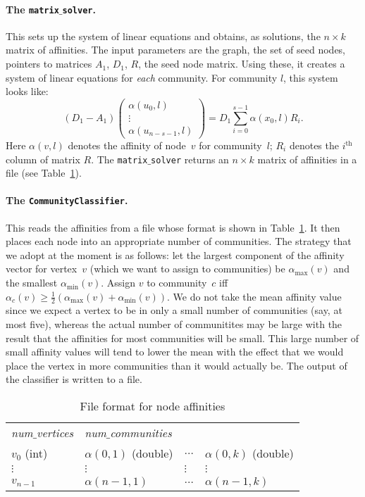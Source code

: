 \documentclass[12pt]{article}
\renewcommand{\th}{\ensuremath{^{\mathrm{th}}}}
\begin{document}
\paragraph{The \texttt{matrix$\_$solver}.} This sets up the system of 
linear equations and obtains, as solutions, the $n \times k$ matrix 
of affinities. The input parameters are the graph, the set of seed nodes, 
pointers to matrices $A_1$, $D_1$, $R$, the seed node matrix. Using these, 
it creates a system of linear equations for \emph{each} community.   
For community $l$, this system looks like:
\[
	(D_1 -  A_1) \begin{pmatrix} \alpha(u_0, l) \\ \vdots \\ \alpha(u_{n - s -1}, l) \end{pmatrix}	
		= D_1 \sum_{i = 0}^{s - 1} \alpha(x_0, l) R_i. 
\] 
Here $\alpha(v, l)$ denotes the affinity of node~$v$ for community~$l$; $R_i$ 
denotes the $i\th$ column of matrix $R$. The \texttt{matrix$\_$solver} returns 
an $n \times k$ matrix of affinities in a file (see Table~\ref{tab:node_aff}).

\paragraph{The \texttt{CommunityClassifier}.} This reads the affinities 
from a file whose format is shown in Table~\ref{tab:node_aff}.
It then places each node into an appropriate number of communities. 
The strategy that we adopt at the moment is as follows: let 
the largest component of the affinity vector for vertex~$v$ (which 
we want to assign to communities) be $\alpha_{\max}(v)$ and the smallest 
$\alpha_{\min}(v)$. Assign $v$ to community~$c$ iff 
$\alpha_c(v) \geq \frac{1}{2}(\alpha_{\max}(v) + \alpha_{\min}(v))$.
We do not take the mean affinity value since we expect a vertex 
to be in only a small number of communities (say, at most five), whereas
the actual number of communitites may be large with the result that 
the affinities for most communities will be small. This large number 
of small affinity values will tend to lower the mean with the effect that
we would place the vertex in more communities than it would actually be.
The output of the classifier is written to a file.

\begin{table}[ht]
\centering
\begin{tabular}{llll}
\emph{num$\_$vertices} & \emph{num$\_$communities} &  & \\
$v_0$ (int)              & $\alpha(0, 1)$ (double) & $\ldots$ & $\alpha(0, k)$ (double) \\
$\vdots$ & $\vdots$ & $\vdots$ & $\vdots$ \\
$v_{n-1}$  & $\alpha(n-1, 1)$ & $\ldots$ & $\alpha(n-1, k)$ 
\end{tabular}
\caption{File format for node affinities}\label{tab:node_aff}
\end{table}
%
\end{document}
